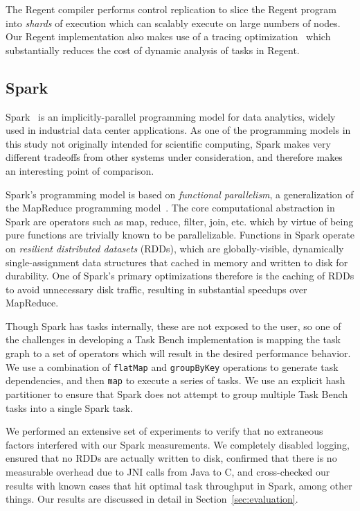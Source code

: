 The Regent compiler performs control replication to slice the Regent
program into \emph{shards} of execution which can scalably execute on
large numbers of nodes. Our Regent implementation also makes use of a
tracing optimization~\cite{LegionTracing18} which substantially
reduces the cost of dynamic analysis of tasks in Regent.

\subsection{Spark}

Spark~\cite{Spark10} is an implicitly-parallel programming model for
data analytics, widely used in industrial data center applications. As
one of the programming models in this study not originally intended
for scientific computing, Spark makes very different tradeoffs from
other systems under consideration, and therefore makes an interesting
point of comparison.

Spark's programming model is based on \emph{functional parallelism}, a
generalization of the MapReduce programming
model~\cite{MapReduce04}. The core computational abstraction in Spark
are operators such as map, reduce, filter, join, etc. which by virtue
of being pure functions are trivially known to be
parallelizable. Functions in Spark operate on \emph{resilient
  distributed datasets} (RDDs), which are globally-visible,
dynamically single-assignment data structures that cached in memory
and written to disk for durability. One of Spark's primary
optimizations therefore is the caching of RDDs to avoid unnecessary
disk traffic, resulting in substantial speedups over MapReduce.

Though Spark has tasks internally, these are not exposed to the user,
so one of the challenges in developing a Task Bench implementation is
mapping the task graph to a set of operators which will result in the
desired performance behavior. We use a combination of
\lstinline[language=Scala]{flatMap} and
\lstinline[language=Scala]{groupByKey} operations to generate task
dependencies, and then \lstinline[language=Scala]{map} to execute a
series of tasks. We use an explicit hash partitioner to ensure that
Spark does not attempt to group multiple Task Bench tasks into a
single Spark task.

We performed an extensive set of experiments to verify that no
extraneous factors interfered with our Spark measurements. We
completely disabled logging, ensured that no RDDs are actually written
to disk, confirmed that there is no measurable overhead due to JNI
calls from Java to C, and cross-checked our results with known cases
that hit optimal task throughput in Spark, among other things. Our
results are discussed in detail in Section~\ref{sec:evaluation}.

